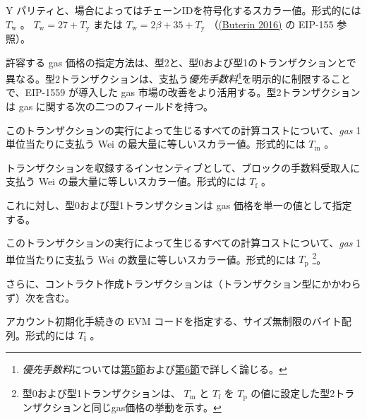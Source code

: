 \documentclass[
]{ltjsarticle}
\providecommand{\tightlist}{%
  \setlength{\itemsep}{0pt}\setlength{\parskip}{0pt}}
\begin{document}
\begin{description}
\tightlist
\item[w]
Y パリティと、場合によってはチェーンIDを符号化するスカラー値。形式的には
\(T_{\mathrm{w}}\) 。 \(T_{\mathrm{w}} = 27 + T_{\mathrm{y}}\) または
\(T_{\mathrm{w}} = 2\beta + 35 + T_{\mathrm{y}}\)
（\protect\hyperlink{ref-EIP-155}{(Buterin 2016)} の EIP-155 参照）。
\end{description}

許容する gas
価格の指定方法は、型2と、型0および型1のトランザクションとで異なる。型2トランザクションは、支払う\emph{優先手数料}\footnote{\emph{優先手数料}については\protect\hyperlink{ch:payment}{第5節}および\protect\hyperlink{ch:transactions}{第6節}で詳しく論じる。}を明示的に制限することで、EIP-1559
が導入した gas 市場の改善をより活用する。型2トランザクションは gas
に関する次の二つのフィールドを持つ。

\begin{description}
\tightlist
\item[maxFeePerGas]
このトランザクションの実行によって生じるすべての計算コストについて、\emph{gas}
1単位当たりに支払う Wei の最大量に等しいスカラー値。形式的には
\(T_{\mathrm{m}}\) 。
\item[maxPriorityFeePerGas]
トランザクションを収録するインセンティブとして、ブロックの手数料受取人に支払う
Wei の最大量に等しいスカラー値。形式的には \(T_{\mathrm{f}}\) 。
\end{description}

これに対し、型0および型1トランザクションは gas
価格を単一の値として指定する。

\begin{description}
\tightlist
\item[gasPrice]
このトランザクションの実行によって生じるすべての計算コストについて、\emph{gas}
1単位当たりに支払う Wei の数量に等しいスカラー値。形式的には
\(T_{\mathrm{p}}\) \footnote{型0および型1トランザクションは、
  \(T_{\mathrm{m}}\) と \(T_{\mathrm{f}}\) を \(T_{\mathrm{p}}\)
  の値に設定した型2トランザクションと同じgas価格の挙動を示す。}。
\end{description}

さらに、コントラクト作成トランザクションは（トランザクション型にかかわらず）次を含む。

\begin{description}
\tightlist
\item[init]
アカウント初期化手続きの EVM
コードを指定する、サイズ無制限のバイト配列。形式的には
\(T_{\mathbf{i}}\) 。
\end{description}
\end{document}
